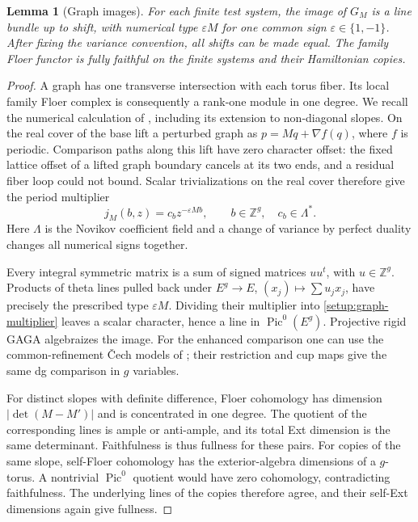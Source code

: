 \documentclass[11pt]{article}
\numberwithin{equation}{section}
\newtheorem{lemma}[theorem]{Lemma}
\theoremstyle{definition}
\theoremstyle{remark}
\begin{document}
\begin{lemma}[Graph images]
\label{setup:graph-images}
For each finite test system, the image of $G_M$ is a line bundle up to
shift, with numerical type $\varepsilon M$ for one common sign
$\varepsilon\in\{1,-1\}$.  After fixing the variance convention, all
shifts can be made equal.  The family Floer functor is fully faithful
on the finite systems and their Hamiltonian copies.
\end{lemma}

\begin{proof}
A graph has one transverse intersection with each torus fiber.  Its
local family Floer complex is consequently a rank-one module in one
degree.  We recall the numerical calculation of
\cite[Lemma~9.1]{A8}, including its extension to non-diagonal slopes.
On the real cover of the base lift a perturbed graph as
$p=Mq+\nabla f(q)$, where $f$ is periodic.  Comparison paths along this
lift have zero character offset: the fixed lattice offset of a lifted
graph boundary cancels at its two ends, and a residual fiber loop could
not bound.  Scalar trivializations on the real cover therefore give
the period multiplier
\begin{equation}
 j_M(b,z)=c_bz^{-\varepsilon Mb},\qquad
 b\in\mathbb Z^g,\quad c_b\in\Lambda^*.
 \label{setup:graph-multiplier}
\end{equation}
Here $\Lambda$ is the Novikov coefficient field and a change of variance
by perfect duality changes all numerical signs together.

Every integral symmetric matrix is a sum of signed matrices $uu^t$,
with $u\in\mathbb Z^g$.  Products of theta lines pulled back under
$E^g\to E$, $(x_j)\mapsto\sum u_jx_j$, have precisely the prescribed
type $\varepsilon M$.  Dividing their multiplier into
\eqref{setup:graph-multiplier} leaves a scalar character, hence a line
in $\operatorname{Pic}^0(E^g)$.  Projective rigid GAGA algebraizes the
image.  For the enhanced comparison one can use the common-refinement
\v Cech models of \cite[Section~9]{A8}; their restriction and cup maps
give the same dg comparison in $g$ variables.

For distinct slopes with definite difference, Floer cohomology has
dimension $|\det(M-M')|$ and is concentrated in one degree.  The quotient
of the corresponding lines is ample or anti-ample, and its total Ext
dimension is the same determinant.  Faithfulness is thus fullness for
these pairs.  For copies of the same slope, self-Floer cohomology has
the exterior-algebra dimensions of a $g$-torus.  A nontrivial
$\operatorname{Pic}^0$ quotient would have zero cohomology, contradicting
faithfulness.  The underlying lines of the copies therefore agree, and
their self-Ext dimensions again give fullness.


\end{proof}
\end{document}
